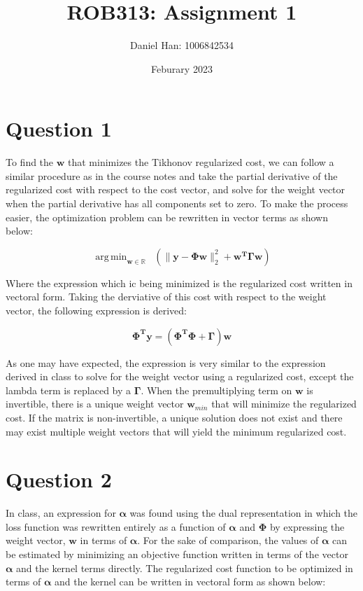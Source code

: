 \documentclass{article}
\title{ROB313: Assignment 1}
\author{Daniel Han: 1006842534}
\date{Feburary 2023}
\DeclareMathOperator*{\argmin}{arg\,min}
\begin{document}
\maketitle

\section*{Question 1}
To find the $\textbf{w}$ that minimizes the Tikhonov regularized cost, we can follow a similar procedure as in the course notes and take the partial derivative of the regularized cost with respect to the cost vector, and solve for the weight vector when the partial derivative has all components set to zero. To make the process easier, the optimization problem can be rewritten in vector terms as shown below:

\begin{equation}
\argmin_{\textbf{w} \in \mathbb{R}} \;\;  (\| \textbf{y} - \mathbf{\Phi}\mathbf{w} \|_2^2 + \mathbf{w^T}\mathbf{\Gamma}\mathbf{w})
\end{equation}

Where the expression which ic being minimized is the regularized cost written in vectoral form. Taking the derviative of this cost with respect to the weight vector, the following expression is derived:

\begin{equation}
\mathbf{\Phi^T}\mathbf{y} = (\mathbf{\Phi^T \Phi} + \mathbf{\Gamma})\mathbf{w}
\end{equation}

As one may have expected, the expression is very similar to the expression derived in class to solve for the weight vector using a regularized cost, except the lambda term is replaced by a $\mathbf{\Gamma}$. When the premultiplying term on $\mathbf{w}$ is invertible, there is a unique weight vector $\mathbf{w}_{min}$ that will minimize the regularized cost. If the matrix is non-invertible, a unique solution does not exist and there may exist multiple weight vectors that will yield the minimum regularized cost.

\section*{Question 2}
In class, an expression for $\boldsymbol\alpha$ was found using the dual representation in which the loss function was rewritten entirely as a function of $\boldsymbol\alpha$ and $\mathbf{\Phi}$ by expressing the weight vector, $\mathbf{w}$ in terms of $\boldsymbol\alpha$. For the sake of comparison, the values of $\boldsymbol\alpha$ can be estimated by minimizing an objective function written in terms of the vector $\boldsymbol\alpha$ and the kernel terms directly. The regularized cost function to be optimized in terms of $\boldsymbol\alpha$ and the kernel can be written in vectoral form as shown below:
\end{document}
